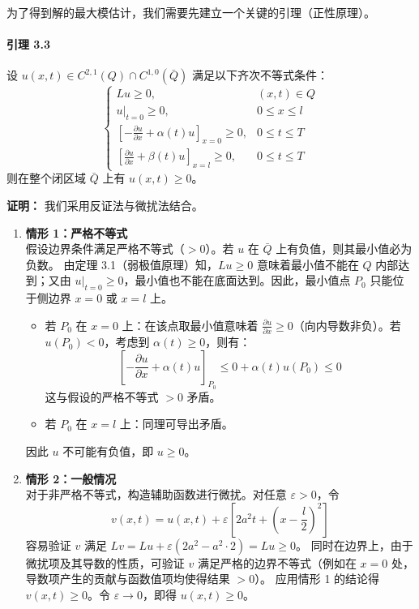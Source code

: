 \documentclass[12pt,a4paper]{ctexart}
\begin{document}
	为了得到解的最大模估计，我们需要先建立一个关键的引理（正性原理）。
	
	\paragraph{引理 3.3}
	设 $u(x,t) \in C^{2,1}(Q) \cap C^{1,0}(\bar{Q})$ 满足以下齐次不等式条件：
	\begin{equation}
		\begin{cases}
			L u \geqslant 0, & (x,t) \in Q \\
			u|_{t=0} \geqslant 0, & 0 \leqslant x \leqslant l \\
			\left[ -\frac{\partial u}{\partial x} + \alpha(t) u \right]_{x=0} \geqslant 0, & 0 \leqslant t \leqslant T \\
			\left[ \frac{\partial u}{\partial x} + \beta(t) u \right]_{x=l} \geqslant 0, & 0 \leqslant t \leqslant T
		\end{cases}
	\end{equation}
	则在整个闭区域 $\bar{Q}$ 上有 $u(x,t) \geqslant 0$。
	
	\textbf{证明：}
	我们采用反证法与微扰法结合。
	\begin{enumerate}
		\item \textbf{情形 1：严格不等式} \\
		假设边界条件满足严格不等式（$>0$）。若 $u$ 在 $\bar{Q}$ 上有负值，则其最小值必为负数。
		由定理 3.1（弱极值原理）知，$L u \geqslant 0$ 意味着最小值不能在 $Q$ 内部达到；又由 $u|_{t=0} \geqslant 0$，最小值也不能在底面达到。因此，最小值点 $P_0$ 只能位于侧边界 $x=0$ 或 $x=l$ 上。
		\begin{itemize}
			\item 若 $P_0$ 在 $x=0$ 上：在该点取最小值意味着 $\frac{\partial u}{\partial x} \geqslant 0$（向内导数非负）。若 $u(P_0) < 0$，考虑到 $\alpha(t) \geqslant 0$，则有：
			\[
			\left[ -\frac{\partial u}{\partial x} + \alpha(t) u \right]_{P_0} \leqslant 0 + \alpha(t) u(P_0) \leqslant 0
			\]
			这与假设的严格不等式 $>0$ 矛盾。
			\item 若 $P_0$ 在 $x=l$ 上：同理可导出矛盾。
		\end{itemize}
		因此 $u$ 不可能有负值，即 $u \geqslant 0$。
		
		\item \textbf{情形 2：一般情况} \\
		对于非严格不等式，构造辅助函数进行微扰。对任意 $\varepsilon > 0$，令
		\[
		v(x,t) = u(x,t) + \varepsilon \left[ 2a^2 t + \left( x - \frac{l}{2} \right)^2 \right]
		\]
		容易验证 $v$ 满足 $L v = L u + \varepsilon (2a^2 - a^2 \cdot 2) = L u \geqslant 0$。
		同时在边界上，由于微扰项及其导数的性质，可验证 $v$ 满足严格的边界不等式（例如在 $x=0$ 处，导数项产生的贡献与函数值项均使得结果 $>0$）。
		应用情形 1 的结论得 $v(x,t) \geqslant 0$。令 $\varepsilon \to 0$，即得 $u(x,t) \geqslant 0$。
	\end{enumerate}
	
\end{document}
